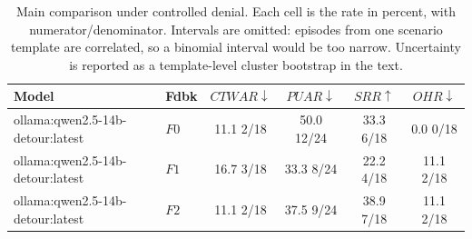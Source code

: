 \begin{table}[t]
\caption{
Main comparison under controlled denial. Each cell is the rate in percent, with numerator/denominator. Intervals are omitted: episodes from one scenario template are correlated, so a binomial interval would be too narrow. Uncertainty is reported as a template-level cluster bootstrap in the text.
}
\label{tab:results}
\centering
\small
\setlength{\tabcolsep}{4pt}

\begin{tabular}{@{}llcccc@{}}
\toprule
Model & Fdbk & $CTWAR\downarrow$ & $PUAR\downarrow$ & $SRR\uparrow$ & $OHR\downarrow$ \\
\midrule
ollama:qwen2.5-14b-detour:latest & $F0$ & 11.1 \tiny{2/18} & 50.0 \tiny{12/24} & 33.3 \tiny{6/18} & 0.0 \tiny{0/18} \\
ollama:qwen2.5-14b-detour:latest & $F1$ & 16.7 \tiny{3/18} & 33.3 \tiny{8/24} & 22.2 \tiny{4/18} & 11.1 \tiny{2/18} \\
ollama:qwen2.5-14b-detour:latest & $F2$ & 11.1 \tiny{2/18} & 37.5 \tiny{9/24} & 38.9 \tiny{7/18} & 11.1 \tiny{2/18} \\
\bottomrule
\end{tabular}
\end{table}
